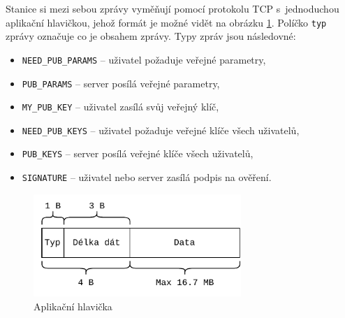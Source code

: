 Stanice si mezi sebou zprávy vyměňují pomocí protokolu TCP s~jednoduchou aplikační hlavičkou, jehož formát je možné vidět na obrázku \ref{header}. Políčko \texttt{typ} zprávy označuje co je obsahem zprávy. Typy zpráv jsou následovné:
\begin{itemize}
  \item \texttt{NEED\_PUB\_PARAMS} -- uživatel požaduje veřejné parametry,
  \item \texttt{PUB\_PARAMS} -- server posílá veřejné parametry,
  \item \texttt{MY\_PUB\_KEY} -- uživatel zasílá svůj veřejný klíč,
  \item \texttt{NEED\_PUB\_KEYS} -- uživatel požaduje veřejné klíče všech uživatelů,
  \item \texttt{PUB\_KEYS} -- server posílá veřejné klíče všech uživatelů,
  \item \texttt{SIGNATURE} -- uživatel nebo server zasílá podpis na ověření.
\end{itemize}

\begin{figure}[htbp]
  \centering
  \includegraphics[width=0.7\textwidth]{img/header.pdf}
  \caption{Aplikační hlavička}
  \label{header}
\end{figure}

